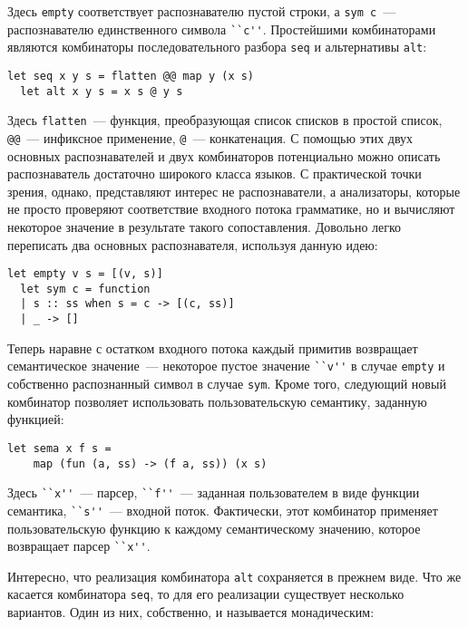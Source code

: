 \documentclass[conference]{IEEEtran}
\begin{document}
Здесь \lstinline|empty| соответствует распознавателю пустой строки, а \lstinline|sym с|~--- распознавателю единственного символа \lstinline|``c''|. Простейшими комбинаторами
являются комбинаторы последовательного разбора \lstinline|seq| и альтернативы \lstinline|alt|:

\begin{lstlisting}[basicstyle=\small]
  let seq x y s = flatten @@ map y (x s)
  let alt x y s = x s @ y s
\end{lstlisting}

Здесь \lstinline|flatten|~--- функция, преобразующая список списков в простой список, \lstinline|@@|~--- инфиксное применение, \lstinline|@|~--- конкатенация. С помощью
этих двух основных распознавателей и двух комбинаторов потенциально можно описать распознаватель достаточно широкого класса языков. С практической точки зрения, однако,
представляют интерес не распознаватели, а анализаторы, которые не просто проверяют соответствие входного потока грамматике, но и вычисляют некоторое значение в результате
такого сопоставления. Довольно легко переписать два основных распознавателя, используя данную идею:

\begin{lstlisting}[basicstyle=\small]
  let empty v s = [(v, s)]
  let sym c = function
  | s :: ss when s = c -> [(c, ss)]
  | _ -> []
\end{lstlisting}

Теперь наравне с остатком входного потока каждый примитив возвращает семантическое значение~--- некоторое пустое значение \lstinline|``v''| в случае \lstinline|empty| и собственно распознанный
символ в случае \lstinline|sym|. Кроме того, следующий новый комбинатор позволяет использовать пользовательскую семантику, заданную функцией:

\begin{lstlisting}[basicstyle=\small]
  let sema x f s =
    map (fun (a, ss) -> (f a, ss)) (x s)
\end{lstlisting}

Здесь \lstinline|``x''|~--- парсер, \lstinline|``f''|~--- заданная пользователем в виде функции семантика, \lstinline|``s''|~--- входной поток. Фактически, этот комбинатор
применяет пользовательскую функцию к каждому семантическому значению, которое возвращает парсер \lstinline|``x''|.

Интересно, что реализация комбинатора \lstinline|alt| сохраняется в прежнем виде. Что же касается комбинатора \lstinline|seq|, то для его реализации существует несколько
вариантов. Один из них, собственно, и называется монадическим:
\end{document}
